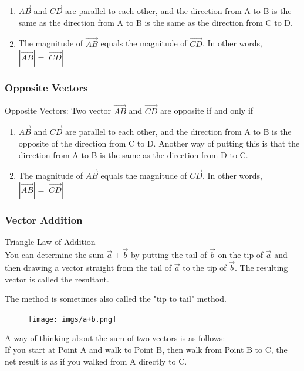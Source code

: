 \documentclass{article}
\begin{document}
\begin{enumerate}
    \item $\overrightarrow{AB}$ and $\overrightarrow{CD}$ are parallel to each other, and the direction from A to B is the same as the direction from A to B is the same as the direction from C to D.
    \item The magnitude of $\overrightarrow{AB}$ equals the magnitude of $\overrightarrow{CD}$. In other words, $|\overrightarrow{AB}|=|\overrightarrow{CD}|$
\end{enumerate}
\subsubsection{Opposite Vectors}
\underline{Opposite Vectors:}
Two vector $\overrightarrow{AB}$ and $\overrightarrow{CD}$ are opposite if and only if
\begin{enumerate}
    \item $\overrightarrow{AB}$ and $\overrightarrow{CD}$ are parallel to each other, and the direction from A to B is the opposite of the direction from C to D. Another way of putting this is that the direction from A to B is the same as the direction from D to C.
    \item The magnitude of $\overrightarrow{AB}$ equals the magnitude of $\overrightarrow{CD}$. In other words, $|\overrightarrow{AB}|=|\overrightarrow{CD}|$
\end{enumerate}
\subsubsection{Vector Addition}
\underline{Triangle Law of Addition}\\

You can determine the sum $\vec{a}+\vec{b}$ by putting the tail of $\vec{b}$ on the tip of $\vec{a}$ and then drawing a vector straight from the tail of $\vec{a}$ to the tip of $\vec{b}$. The resulting vector is called the resultant.

The method is sometimes also called the "tip to tail" method.
\begin{figure}[h]
    \centering
    \texttt{[image: imgs/a+b.png]}
\end{figure}


A way of thinking about the sum of two vectors is as follows:\\

If you start at Point A and walk to Point B, then walk from Point B to C, the net result is as if you walked from A directly to C.\\
\end{document}
